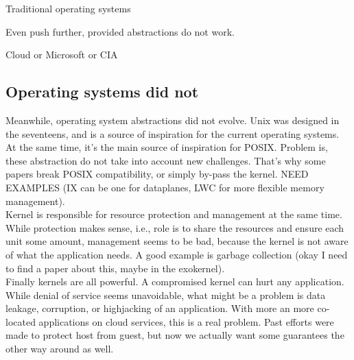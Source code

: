 Traditional operating systems

Even push further, provided abstractions do not work.


Cloud or Microsoft or CIA




\subsection{Operating systems did not}

Meanwhile, operating system abstractions did not evolve.
Unix was designed in the seventeens, and is a source of inspiration for the current operating systems.
At the same time, it's the main source of inspiration for POSIX.
Problem is, these abstraction do not take into account new challenges.
That's why some papers break POSIX compatibility, or simply by-pass the kernel.
NEED EXAMPLES (IX can be one for dataplanes, LWC for more flexible memory management).\\

Kernel is responsible for resource protection and management at the same time.
While protection makes sense, i.e., role is to share the resources and ensure each unit some amount,
management seems to be bad, because the kernel is not aware of what the application needs.
A good example is garbage collection (okay I need to find a paper about this, maybe in the exokernel).\\

Finally kernels are all powerful. A compromised kernel can hurt any application.
While denial of service seems unavoidable, what might be a problem is data leakage, corruption, or highjacking of an application.
With more an more co-located applications on cloud services, this is a real problem.
Past efforts were made to protect host from guest, but now we actually want some guarantees the other way around as well.\\

